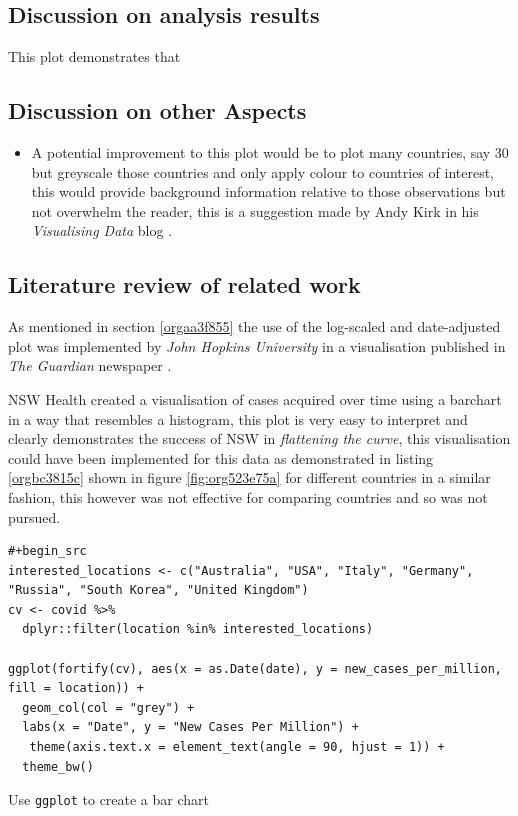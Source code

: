 \documentclass[11pt]{article}
\begin{document}
\subsection{Discussion on analysis results}
\label{sec:org1c13b30}
This plot demonstrates that
\subsection{Discussion on other Aspects}
\label{sec:orgff928f4}
\begin{itemize}
\item A potential improvement to this plot would be to plot many countries, say 30 but greyscale those countries and only apply colour to countries of interest, this would provide background information relative to those observations but not overwhelm the reader, this is a suggestion made by Andy Kirk in his \emph{Visualising Data} blog  \cite{kirk2015}.
\end{itemize}
\subsection{Literature review of related work}
\label{sec:org6b4f9b5}
As mentioned in section \ref{orgaa3f855} the use of the log-scaled and date-adjusted plot was implemented by \emph{John Hopkins University} in a visualisation published in \emph{The Guardian} newspaper \cite{gutierrez2020}.


NSW Health created a visualisation of cases acquired over time using a barchart
in a way that resembles a histogram, \cite{nswhealth2020} this plot is very easy
to interpret and clearly demonstrates the success of NSW in \emph{flattening the
curve}, this visualisation could have been implemented for this data as demonstrated in listing \ref{orgbc3815c} shown in figure \ref{fig:org523e75a} for different countries in a similar fashion, this however was not effective for comparing countries and so was not pursued.


\begin{listing}[htbp]
\begin{verbatim}
#+begin_src
interested_locations <- c("Australia", "USA", "Italy", "Germany", "Russia", "South Korea", "United Kingdom")
cv <- covid %>%
  dplyr::filter(location %in% interested_locations)

ggplot(fortify(cv), aes(x = as.Date(date), y = new_cases_per_million, fill = location)) +
  geom_col(col = "grey") +
  labs(x = "Date", y = "New Cases Per Million") +
   theme(axis.text.x = element_text(angle = 90, hjust = 1)) +
  theme_bw()
\end{verbatim}
\caption{\label{orgbc3815c}Use \texttt{ggplot} to create a bar chart}
\end{listing}
\end{document}
